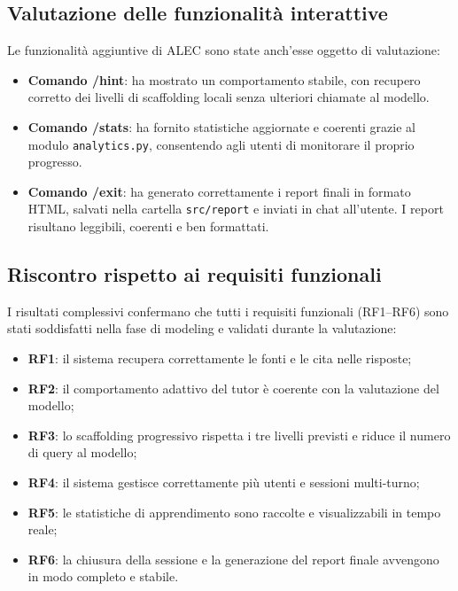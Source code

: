 \documentclass[a4paper,9pt]{article}
\begin{document}
\subsection{Valutazione delle funzionalità interattive}

Le funzionalità aggiuntive di ALEC sono state anch’esse oggetto di valutazione:

\begin{itemize}
	\item \textbf{Comando /hint}: ha mostrato un comportamento stabile, con recupero corretto dei livelli di scaffolding locali senza ulteriori chiamate al modello.
	\item \textbf{Comando /stats}: ha fornito statistiche aggiornate e coerenti grazie al modulo \texttt{analytics.py}, consentendo agli utenti di monitorare il proprio progresso.
	\item \textbf{Comando /exit}: ha generato correttamente i report finali in formato HTML, salvati nella cartella \texttt{src/report} e inviati in chat all’utente. I report risultano leggibili, coerenti e ben formattati.
\end{itemize}

\subsection{Riscontro rispetto ai requisiti funzionali}

I risultati complessivi confermano che tutti i requisiti funzionali (RF1–RF6) sono stati soddisfatti nella fase di modeling e validati durante la valutazione:

\begin{itemize}
	\item \textbf{RF1}: il sistema recupera correttamente le fonti e le cita nelle risposte;
	\item \textbf{RF2}: il comportamento adattivo del tutor è coerente con la valutazione del modello;
	\item \textbf{RF3}: lo scaffolding progressivo rispetta i tre livelli previsti e riduce il numero di query al modello;
	\item \textbf{RF4}: il sistema gestisce correttamente più utenti e sessioni multi-turno;
	\item \textbf{RF5}: le statistiche di apprendimento sono raccolte e visualizzabili in tempo reale;
	\item \textbf{RF6}: la chiusura della sessione e la generazione del report finale avvengono in modo completo e stabile.
\end{itemize}
\end{document}
